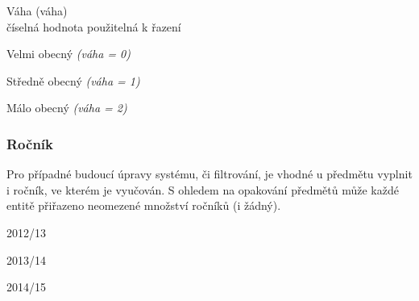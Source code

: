 \begin{list}{-}{Pole}
  \item Váha (váha) \\
    číselná hodnota použitelná k řazení
\end{list}

\begin{list}{-}{Hodnoty}
  \item Velmi obecný \emph{(váha = 0)} 
  \item Středně obecný \emph{(váha = 1)}
  \item Málo obecný \emph{(váha = 2)}
\end{list}

\subsubsection*{Ročník}
Pro případné budoucí úpravy systému, či filtrování, je vhodné u předmětu vyplnit i ročník, ve kterém je vyučován. S ohledem na opakování předmětů může každé entitě přiřazeno neomezené množství ročníků (i žádný). \\

\begin{list}{-}{Hodnoty}
  \item 2012/13
  \item 2013/14
  \item 2014/15
\end{list}
